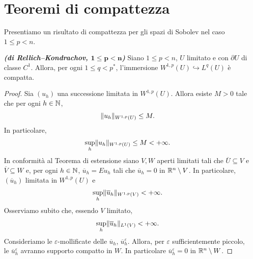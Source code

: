 \section{Teoremi di compattezza}
Presentiamo un risultato di compattezza per gli spazi di Sobolev nel caso $1 \le p < n$.
\begin{teorema}\textbf{\emph{(di Rellich--Kondrachov, $\mathbf{1\le p<n}$)}}
	Siano $1 \le p < n$, $U$ limitato e con $\partial U$ di classe $C^1$. Allora, per ogni $1 \le q < p^\ast$, l'immersione $W^{1,p}(U) \hookrightarrow L^q(U)$ è compatta.
\end{teorema}
\begin{proof}
	Sia $(u_h)$ una successione limitata in $W^{1,p}(U)$. Allora esiste $M>0$ tale che per ogni $h \in \mathbb{N}$,
	\[ \lVert u_h\rVert_{W^{1,p}(U)} \le M. \]
	In particolare, 
	\[ \underset{h}{\textup{sup}}\lVert u_h\rVert_{W^{1,p}(U)} \le M < +\infty. \]
	In conformità al Teorema di estensione siano $V, W$ aperti limitati tali che $\overline{U} \subseteq V$ e $\overline{V} \subseteq W$ e, per ogni $h \in \mathbb{N}$, $\overline{u}_h = Eu_h$ tali che $\overline{u}_h = 0$ in $\mathbb{R}^n\setminus V$. In particolare, $(\overline{u}_h)$ limitata in $W^{1,p}(U)$ e
	\[ \underset{h}{\textup{sup}}\lVert\overline{u}_h\rVert_{W^{1,p}(V)} < +\infty. \]
	Osserviamo subito che, essendo $V$ limitato, 
	\[ \underset{h}{\textup{sup}}\lVert\overline{u}_h\rVert_{L^1(V)} < +\infty.\]
	Consideriamo le $\varepsilon$-mollificate delle $\overline{u}_h$, $\overline{u}_h^\varepsilon$. Allora, per $\varepsilon$ sufficientemente piccolo, le $\overline{u}_h^\varepsilon$ avranno supporto compatto in $W$. In particolare $\overline{u}_h^\varepsilon = 0$ in $\mathbb{R}^n\setminus W$.
	

\end{proof}
